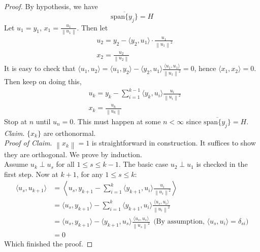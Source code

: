 \documentclass[a4paper, 10pt]{article}
\theoremstyle{definition}
\theoremstyle{hSol}
\begin{document}
\begin{proof} By hypothesis, we have
$$\overline{\text{span}\{y_j\}} = H$$
Let $u_1 = y_1$, $x_1 = \frac{u_1}{\left\|u_1\right\|}$. Then let
\begin{equation}
	\begin{split}
		& u_2 = y_2 - \langle y_2, u_1 \rangle\cdot\frac{u_1}{\left\|u_1\right\|^2}\\
		& x_2 = \frac{u_2}{\left\|u_2\right\|}
	\end{split}
\end{equation}
It is easy to check that $\langle u_1, u_2 \rangle=\langle u_1, y_2 \rangle- \langle y_2, u_1 \rangle\frac{\langle u_1, u_1 \rangle}{\left\|u_1\right\|^2}=0$, hence $\langle x_1, x_2 \rangle=0$. Then keep on doing this,
\begin{equation}
	\begin{split}
		& u_k = y_k - \sum_{i=1}^{k-1} \langle y_k, u_i \rangle\frac{u_i}{\left\|u_i\right\|^2}\\
		& x_k = \frac{u_k}{\left\|u_k\right\|}
	\end{split}
\end{equation}
Stop at $n$ until $u_n=0$. This must happen at some $n<\infty$ since $\overline{\text{span}\{y_j\}} = H$. \\
\textit{Claim}. $\{x_k\}$ are orthonormal. \\
\textit{Proof of Claim}. $\left\|x_k\right\|=1$ is straightforward in construction. It suffices to show they are orthogonal. We prove by induction. \\
Assume $u_k \perp u_s$ for all $1\leq s \leq k-1$. The basic case $u_2\perp u_1$ is checked in the first step. Now at $k+1$, for any $1\leq s\leq k$:
\begin{equation}
	\begin{split}
		\langle u_s, u_{k+1} \rangle &= \left\langle u_s, y_{k+1} - \sum_{i=1}^{k} \langle y_{k+1}, u_i \rangle\frac{u_i}{\left\|u_i\right\|^2} \right\rangle \\
		&= \langle u_s, y_{k+1} \rangle - \sum_{i=1}^k \langle y_{k+1}, u_i \rangle\frac{\langle u_s, u_i \rangle}{\left\|u_i\right\|^2} \\
		&= \langle u_s, y_{k+1} \rangle - \langle y_{k+1}, u_s \rangle\frac{\langle u_s, u_s \rangle}{\left\|u_s\right\|^2}~~\text{(By assumption, $\langle u_s,u_i \rangle=\delta_{si}$)} \\
		& = 0
	\end{split}
\end{equation}
Which finished the proof.
\end{proof}
\end{document}
